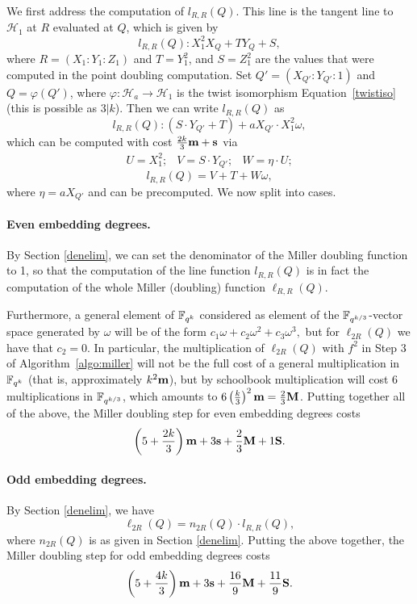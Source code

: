 We first address the computation of $l_{R,R}(Q)$.
This line is the tangent line to $\mathcal{H}_1$ at $R$ evaluated at $Q$, 
which is given by
\[l_{R,R}(Q): X_1^2 X_Q + T Y_Q + S,\]
where $R = (X_1:Y_1:Z_1)$ 
and $T=Y_1^2$, and $S=Z_1^2$ are the values 
that were computed in the point doubling computation.
Set $Q' = (X_{Q'}:Y_{Q'}:1)$ and $Q = \varphi(Q')$, where
$\varphi : \mathcal{H}_a \rightarrow \mathcal{H}_1$ 
is the twist isomorphism Equation~\ref{twistiso}
(this is possible as $3|k$).
Then we can write $l_{R,R}(Q)$ as
\[l_{R,R}(Q): (S \cdot Y_{Q'} + T) + a X_{Q'} \cdot X_1^2 \omega,\]
which can be computed with cost
$\frac{2k}{3}\textbf{m} + \textbf{s}$ via
\[\begin{array}{ccc}
U = X_1^2; & V = S \cdot Y_{Q'}; & W = \eta \cdot U;
\end{array}\]
\[l_{R,R}(Q)= V+T + W\omega,\]
where $\eta = aX_{Q'}$ and can be precomputed.
We now split into cases.

\paragraph*{Even embedding degrees.}

By Section \ref{denelim}, we can set the denominator of the Miller doubling function to 1, so that the computation of the line function $l_{R,R}(Q)$ is in fact
the computation of the whole Miller (doubling) function $\ell_{R,R}(Q)$.

Furthermore, a general element of $\mathbb{F}_{q^k}$ considered as element of the 
$\mathbb{F}_{q^{k/3}}$-vector space generated
by $\omega$ will be of the form 
$c_1 \omega + c_2 \omega^2 + c_3 \omega^3,$
but for $\ell_{2R}(Q)$ we have that $c_2 = 0$. 
In particular, the multiplication of $\ell_{2R}(Q)$ with $f^2$ in
Step 3 of Algorithm~\ref{algo:miller} will not be the full cost of a general multiplication in $\mathbb{F}_{q^k}$ (that
is, approximately $k^2\textbf{m}$), 
but by schoolbook multiplication will cost 6 multiplications in $\mathbb{F}_{q^{k/3}}$, 
which amounts to 
$6 \left(\frac{k}{3}\right)^2 \textbf{m} = \frac{2}{3} \textbf{M}$.
Putting together all of the above, the Miller doubling step for even
embedding degrees costs
$$\left( 5 + \frac{2k}{3}\right)\textbf{m} + 3\textbf{s} + \frac{2}{3}\textbf{M} + 1\textbf{S}.$$

\paragraph*{Odd embedding degrees.}

By Section \ref{denelim}, we have
\[\ell_{2R}(Q) = n_{2R}(Q) \cdot l_{R,R}(Q),\]
where $n_{2R}(Q)$ is as given in Section \ref{denelim}.
Putting the above together, the Miller doubling step 
for odd embedding degrees costs
$$\left(5 + \frac{4k}{3}\right)\textbf{m} + 3\textbf{s} + \frac{16}{9}\textbf{M} + \frac{11}{9}\textbf{S}.$$

